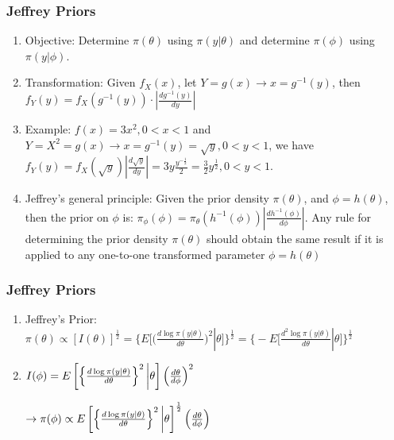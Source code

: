 \documentclass{beamer}
\begin{document}

\begin{frame}
\frametitle{Jeffrey Priors}

\begin{enumerate}
\item Objective: Determine $\pi(\theta)$ using $\pi(y|\theta)$ and determine $\pi(\phi)$ using $\pi(y|\phi)$.  

\item Transformation: Given $f_X(x)$, let $Y = g(x) \rightarrow x = g^{-1}(y)$, then $f_Y(y) = f_X(g^{-1}(y)) \cdot |\frac{d g^{-1}(y)}{dy}|$
\item Example: $f(x) = 3x^2, 0<x<1$ and $Y=X^2 = g(x) \rightarrow x = g^{-1}(y) = \sqrt{y}, 0<y<1$, we have $f_Y(y) = f_X(\sqrt{y})|\frac{d \sqrt{y}}{dy}| = 3y \frac{y^{-\frac{1}{2}}}{2} = \frac{3}{2}y^{\frac{1}{2}}, 0<y<1$.

\item Jeffrey's general principle: Given the prior density $\pi(\theta)$, and $\phi = h(\theta)$, then the prior on $\phi$ is: $\pi_{\phi}(\phi) = \pi_{\theta}(h^{-1}(\phi)) |\frac{d h^{-1}(\phi)}{d\phi}|$. Any rule for determining the prior density $\pi(\theta)$ should obtain the same result if it is applied to any one-to-one transformed parameter $\phi = h(\theta)$

\end{enumerate}

\end{frame}


\begin{frame}
\frametitle{Jeffrey Priors}

\begin{enumerate}
\item Jeffrey's Prior: $\pi(\theta) \propto [I(\theta)]^{\frac{1}{2}} = \Bigg \{E\Big[\Big(\frac{d \log \pi(y|\theta)}{d\theta}\Big)^2|\theta\Big]\Bigg \}^{\frac{1}{2}} = \Bigg \{-E\Big[\frac{d^2 \log \pi(y|\theta)}{d\theta}|\theta\Big]\Bigg\}^{\frac{1}{2}}$

\item $I(\phi) = E\left[\left\{\frac{d \log \pi(y \mid \theta)}{d \theta}\right\}^2 \bigg{|} \theta \right]  \left(\frac{d\theta}{d \phi}\right)^2$ 

$\rightarrow \pi(\phi) \propto E\left[\left\{\frac{d \log \pi(y \mid \theta)}{d \theta}\right\}^2 \bigg{|} \theta \right] ^{\frac{1}{2}} \left(\frac{d\theta}{d \phi}\right)$

\end{enumerate}

\end{frame}
\end{document}
